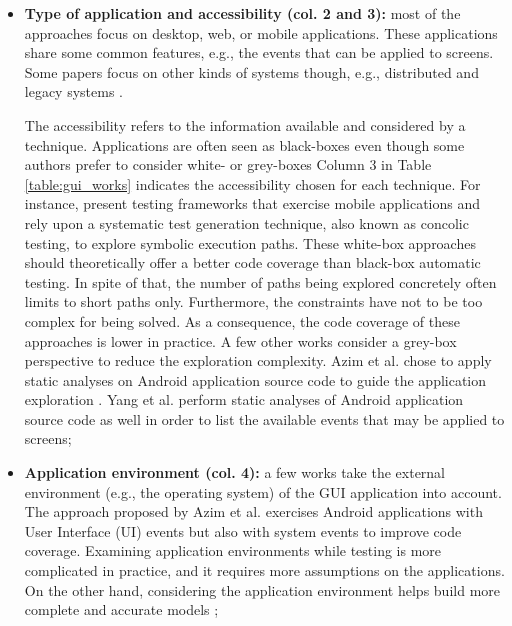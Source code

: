 \begin{itemize}
	\item \textbf{Type of application and accessibility (col.
	2 and 3):} most of the approaches focus on desktop, web, or
	mobile applications. These applications share some common
	features, e.g., the events that can be applied to screens.
	Some papers focus on other kinds of systems though, e.g.,
	distributed and legacy systems \cite{hungar2002}.

	The accessibility refers to the information available and
	considered by a technique. Applications are often seen as
	black-boxes even though some authors prefer to consider
	white- or grey-boxes Column 3 in Table
	\ref{table:gui_works} indicates the accessibility chosen
	for each technique. For instance,
	\cite{concolicandroid12,5416728} present testing frameworks
	that exercise mobile applications and rely upon a
	systematic test generation technique, also known as concolic
	testing, to explore symbolic execution paths. These white-box
	approaches should theoretically offer a better code coverage
    than black-box automatic testing. In spite of that, the
    number of paths being explored concretely often limits to
    short paths only. Furthermore, the constraints have not to be
    too complex for being solved. As a consequence, the code
    coverage of these approaches is lower in practice.
	A few other works consider a grey-box perspective to reduce
	the exploration complexity. Azim et al. chose to apply static
	analyses on Android application source code to guide the
	application exploration \cite{Azim13}. Yang et al.
	\cite{WPX13} perform static analyses of Android application
	source code as well in order to list the available events
	that may be applied to screens;

	\item \textbf{Application environment (col. 4):} a few works
	\cite{Azim13,SP15} take the external environment (e.g., the
	operating system) of the GUI application into account.
	The approach proposed by Azim et al. \cite{Azim13} exercises
	Android applications with User Interface (UI) events but also
	with system events to improve code coverage. Examining
	application environments while testing is more complicated in
	practice, and it requires more assumptions on the
    applications. On the other hand, considering the application
    environment helps build more complete and accurate models
    \cite{SP15};



\end{itemize}
